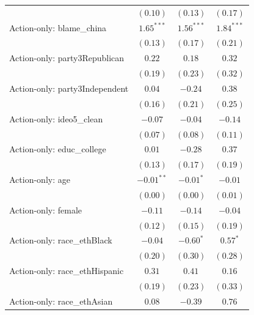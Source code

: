 \begin{tabular}{l c c c}
                                       & $(0.10)$      & $(0.13)$      & $(0.17)$      \\
Action-only: blame\_china              & $1.65^{***}$  & $1.56^{***}$  & $1.84^{***}$  \\
                                       & $(0.13)$      & $(0.17)$      & $(0.21)$      \\
Action-only: party3Republican          & $0.22$        & $0.18$        & $0.32$        \\
                                       & $(0.19)$      & $(0.23)$      & $(0.32)$      \\
Action-only: party3Independent         & $0.04$        & $-0.24$       & $0.38$        \\
                                       & $(0.16)$      & $(0.21)$      & $(0.25)$      \\
Action-only: ideo5\_clean              & $-0.07$       & $-0.04$       & $-0.14$       \\
                                       & $(0.07)$      & $(0.08)$      & $(0.11)$      \\
Action-only: educ\_college             & $0.01$        & $-0.28$       & $0.37$        \\
                                       & $(0.13)$      & $(0.17)$      & $(0.19)$      \\
Action-only: age                       & $-0.01^{**}$  & $-0.01^{*}$   & $-0.01$       \\
                                       & $(0.00)$      & $(0.00)$      & $(0.01)$      \\
Action-only: female                    & $-0.11$       & $-0.14$       & $-0.04$       \\
                                       & $(0.12)$      & $(0.15)$      & $(0.19)$      \\
Action-only: race\_ethBlack            & $-0.04$       & $-0.60^{*}$   & $0.57^{*}$    \\
                                       & $(0.20)$      & $(0.30)$      & $(0.28)$      \\
Action-only: race\_ethHispanic         & $0.31$        & $0.41$        & $0.16$        \\
                                       & $(0.19)$      & $(0.23)$      & $(0.33)$      \\
Action-only: race\_ethAsian            & $0.08$        & $-0.39$       & $0.76$        \\

\end{tabular}
